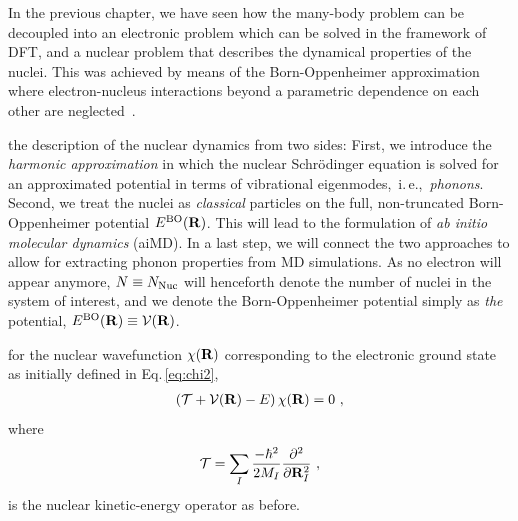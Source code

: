 In the previous chapter, we have seen how the many-body problem can be decoupled into an electronic problem %
which can be solved in the framework of DFT, and a nuclear problem %
that describes the dynamical properties of the nuclei. This was achieved by means of the Born-Oppenheimer approximation where electron-nucleus interactions beyond a parametric dependence on each other are neglected~\cite{BornOppenheimer}.

 the description of the nuclear dynamics from two sides: First, we introduce the \emph{harmonic approximation} in which the nuclear Schr\"odinger equation is solved for an approximated potential in terms of vibrational eigenmodes,~i.\,e.,~\emph{phonons}. 
Second, we treat the nuclei as \emph{classical} particles on the full, non-truncated Born-Oppenheimer potential $E^{\rm BO} ({\bf R})$. This will lead to the formulation of \emph{ab initio molecular dynamics} (aiMD). In a last step, we will connect the two approaches to allow for extracting phonon properties from MD simulations.
As no electron will appear anymore, $N \equiv N_{\rm Nuc}$ will henceforth denote the number of nuclei in the system of interest, and we denote the Born-Oppenheimer potential simply as \emph{the} potential, $E^{\rm BO} ({\bf R}) \equiv \mathcal V ({\bf R})$.

 for the nuclear wavefunction $\chi ({\bf R})$ corresponding to the electronic ground state as initially defined in Eq.\,\eqref{eq:chi2},
\begin{align}
\left( \mathcal T + \mathcal V ({\bf R}) - E \right) \chi ({\bf R})
= 0~,
\label{eq:BOSE}
\end{align}
where
\begin{align}
\mathcal  T
= \sum_I \frac{- \hbar^2}{2 M_I} \frac{\partial^2}{\partial {\bf R}_I^2}~,
\label{eq:Tnuc2}
\end{align}
is the nuclear kinetic-energy operator as before.

\newpage
